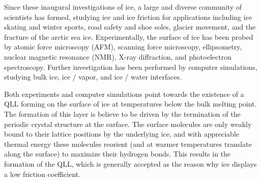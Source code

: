 Since these inaugural investigations of ice, a large and diverse
community of scientists has formed, studying ice and ice friction
for applications including ice skating and winter 
sports\cite{Rosenberg2005,Kietzig2010}, 
road safety and shoe soles\cite{Roberts1981,Higgins2008}, 
glacier movement\cite{Casassa1991, Sukhorukov2013, Pritchard2012},
and the fracture of the arctic sea 
ice\cite{Schulson2004,Weiss2007,Feltham2008,Lishman2011,Lishman2013}.  
Experimentally, the surface of ice has been probed by atomic force
microscopy
(AFM)\cite{Doppenschmidt1998,Bluhm1999,Bluhm2000}, scanning force
microscopy\cite{Bluhm1998}, ellipsometry\cite{Beaglehole1980,Beaglehole1993},
nuclear magnetic resonance (NMR)\cite{Ishizaki1996}, X-ray 
diffraction\cite{Dosch1996}, and photoelectron
spectroscopy\cite{Bluhm2002}. Further investigation has been performed by
computer simulations, studying bulk 
ice\cite{Kerr1988,Tse1988,Hayward1997,Gao2000,Rick2005,Dong2001,Weber1983,Wang2005,Kuo2005,Buch1998,Rick2001,Gay2002}, 
ice / vapor\cite{Kroes1992,Devlin1995,Ikeda-Fukazawa2004,Picaud2006,Conde2008,Pereyra2009},
and ice / water\cite{Baez1995,Bryk2002,Bryk2004,Bryk2004a,Gao2000,GarciaFernandez2006,Hayward2002,Hayward2001,Karim1988,Karim1987,Karim1990,Louden2013,Nada1997,NadaH.andFurukawa1995,Nada1996,Nada2000,Nada1997a} interfaces. 


Both experiments and computer simulations point towards the existence
of a QLL forming on the surface of ice at temperatures below the bulk
melting point. The formation of this layer is believe to be driven by
the termination of the periodic crystal structure at the surface. The
surface molecules are only weakly bound to their lattice positions by
the underlying ice, and with appreciable thermal energy these
molecules reorient (and at warmer temperatures translate along the
surface) to maximize their hydrogen bonds. This results in the
formation of the QLL, which is generally accepted as the reason why
ice displays a low friction
coefficient\cite{Malenkov2009,Dash1995,Rosenberg2005,Dash2006}.


